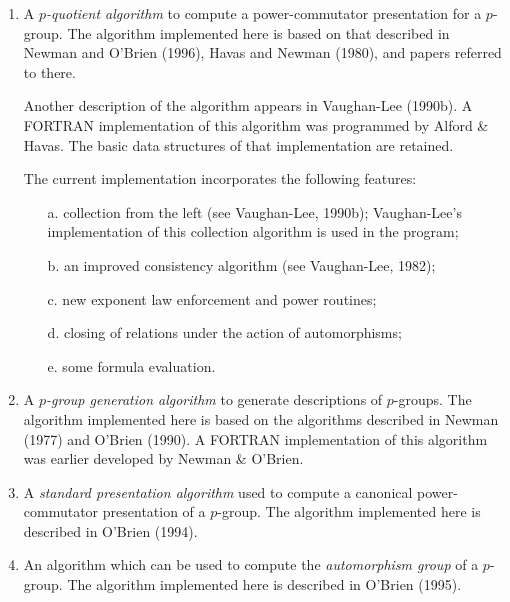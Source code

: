 \documentclass[12pt]{article}
\begin{document}
\begin{enumerate}
\item
A \emph{$p$-quotient algorithm} to compute a power-commutator presentation
for a $p$-group.  The algorithm implemented here is based on that 
described in Newman and O'Brien (1996), Havas and Newman (1980),
and papers referred to there.

Another description of the algorithm appears in Vaughan-Lee (1990b).
A FORTRAN implementation of this algorithm was programmed by 
Alford \& Havas. The basic data structures of that implementation 
are retained.

The current implementation incorporates the following features:

\begin{enumerate}
\item[a.]
   collection from the left (see Vaughan-Lee, 1990b); 
   Vaughan-Lee's implementation of this collection 
   algorithm is used in the program;

\item[b.]
   an improved consistency algorithm (see Vaughan-Lee, 1982);

\item[c.]
   new exponent law enforcement and power routines; 

\item[d.]
   closing of relations under the action of automorphisms;

\item[e.]
   some formula evaluation.
\end{enumerate}

\item
A \emph{$p$-group generation algorithm} to generate descriptions of $p$-groups. 
The algorithm implemented here is based on the algorithms described in 
Newman (1977) and O'Brien (1990). A FORTRAN implementation of this 
algorithm was earlier developed by Newman \& O'Brien.  

\item
A \emph{standard presentation algorithm} used to compute a canonical 
power-commutator presentation of a $p$-group. The algorithm 
implemented here is described in O'Brien (1994).

\item
An algorithm which can be used to compute the \emph{automorphism group} of 
a $p$-group. The algorithm implemented here is described in O'Brien (1995).
\end{enumerate}
\end{document}
